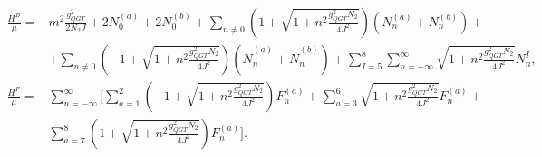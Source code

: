 \begin{equation}
\begin{aligned}   
\frac{H^B}{\mu} =& 
       m^2 \frac{ g_{QGT}^2}{2 N_2 J}
         + 2 N^{(a)}_0 +  2 N^{(b)}_0 +
        \sum_{n \neq 0}   
              \left(1 +  \sqrt{1 + n^2\frac{g_{QGT}^2 N_2}{4 J^2}}\right)
                 \left( N^{(a)}_n  + N^{(b)}_n \right) +              \\ 
    &   +\sum_{n \neq 0} 
              \left(-1 +  \sqrt{1 + n^2\frac{g_{QGT}^2 N_2}{4 J^2}}\right) 
                  \left(\tilde{N}^{(a)}_n + \tilde{N}^{(b)}_n \right) +
       \sum_{I=5}^8 \sum_{n = -\infty}^{\infty}  \sqrt{1 + n^2 \frac{g_{QGT}^2 N_2}{4 J^2}} 
                                                                     N_n^{I},          \\ 
\frac{H^F}{\mu} =& 
        \sum_{n=-\infty}^{\infty}
        \Bigg[
           \sum_{a=1}^{2} \left(-1 + \sqrt{1 + n^2 \frac{g_{QGT}^2 N_2}{4 J^2}}\right) F^{(a)}_n +
           \sum_{a=3}^{6} \sqrt{1 + n^2 \frac{g_{QGT}^2 N_2}{4 J^2}} F^{(a)}_n +    \\ 
    &       \sum_{a=7}^{8} \left(1 + \sqrt{1 + n^2 \frac{g_{QGT}^2 N_2}{4 J^2}}\right) F^{(a)}_n
        \Bigg].
\end{aligned}
\end{equation}

